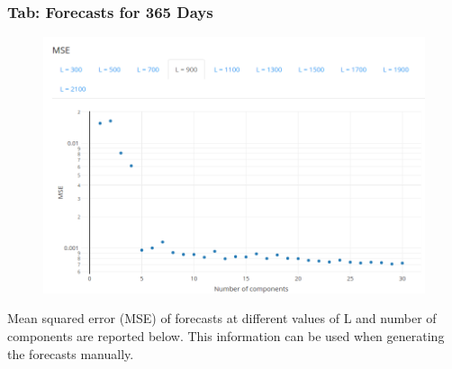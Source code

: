 \documentclass[pdf, unicode, notheorems, xcolor={table}]{beamer}
\begin{document}
\begin{frame}\frametitle{Tab: Forecasts for 365 Days}
	\begin{figure}
		\includegraphics[width=0.8 \linewidth]{mse}
	\end{figure}

	Mean squared error (MSE) of forecasts at different values of L and number of components are reported below. This information can be used when generating the forecasts manually.
\end{frame}
\end{document}

